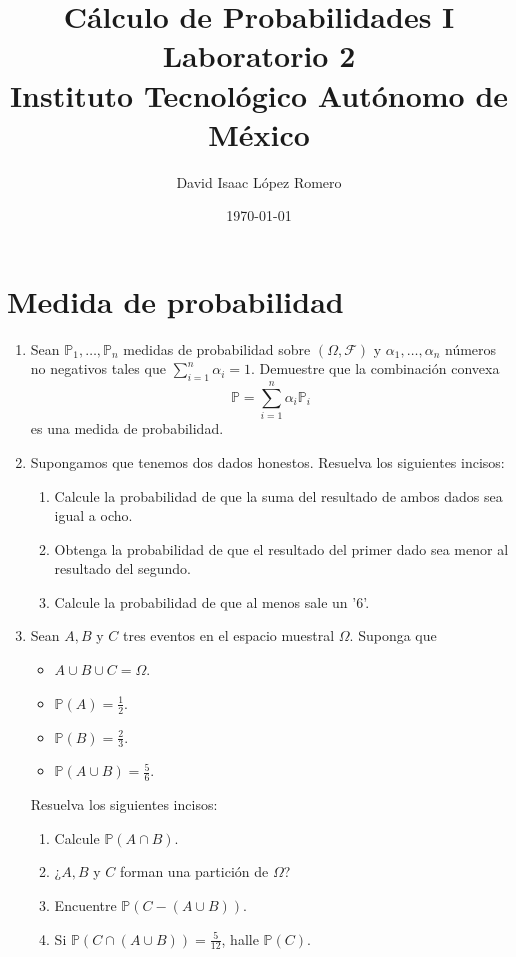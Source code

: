 \documentclass[10pt,a4paper]{article}
\title{Cálculo de Probabilidades I \\
	\large Laboratorio 2\\ Instituto Tecnológico Autónomo de México}
\author{David Isaac López Romero}
\date{\today}
\begin{document}
	
	\maketitle
	
	\section{Medida de probabilidad}
	
	\begin{enumerate}
		
		\item Sean $\mathbb{P}_1, \dots, \mathbb{P}_n$ medidas de probabilidad sobre $(\Omega, \mathcal{F})$ y $\alpha_1,\dots,\alpha_n$ números no negativos tales que $\sum_{i=1}^{n} \alpha_i = 1$. Demuestre que la combinación convexa
		\[
		\mathbb{P} = \sum_{i=1}^{n} \alpha_i \mathbb{P}_i
		\]
		es una medida de probabilidad.
		
		\item Supongamos que tenemos dos dados honestos. Resuelva los siguientes incisos:
		\begin{enumerate}
			\item Calcule la probabilidad de que la suma del resultado de ambos dados sea igual a ocho.
			\item Obtenga la probabilidad de que el resultado del primer dado sea menor al resultado del segundo.
			\item Calcule la probabilidad de que al menos sale un '6'.
		\end{enumerate} 
		
		\item Sean $A,B$ y $C$ tres eventos en el espacio muestral $\Omega$. Suponga que
		\begin{itemize}
			\item $A \cup B \cup C = \Omega$.
			\item $\mathbb{P}(A) = \frac{1}{2}$.
			\item $\mathbb{P}(B) = \frac{2}{3}$.
			\item $\mathbb{P}(A \cup B) = \frac{5}{6}$.
		\end{itemize}
		Resuelva los siguientes incisos:
		\begin{enumerate}
			\item Calcule $\mathbb{P}(A \cap B)$.
			\item ¿$A,B$ y $C$ forman una partición de $\Omega$?
			\item Encuentre $\mathbb{P}(C - (A \cup B))$.
			\item Si $\mathbb{P}(C \cap (A \cup B)) = \frac{5}{12}$, halle $\mathbb{P}(C)$.
		\end{enumerate}
	

\end{enumerate}
\end{document}
